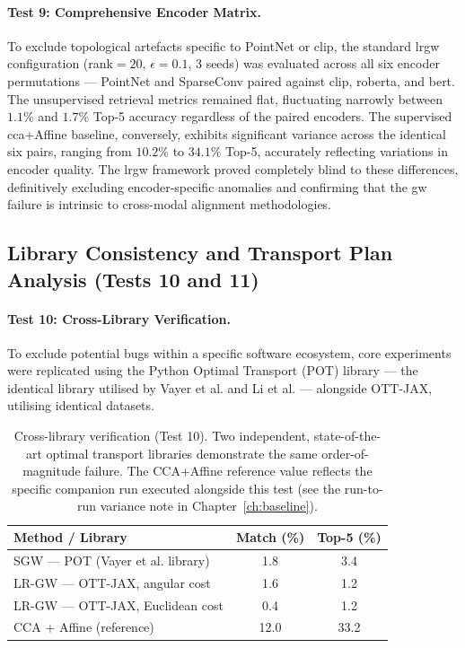 \paragraph{Test 9: Comprehensive Encoder Matrix.}
To exclude topological artefacts specific to PointNet or \gls{clip}, the standard \gls{lrgw} configuration (rank$=20$, $\epsilon=0.1$, 3 seeds) was evaluated across all six encoder permutations --- PointNet and SparseConv paired against \gls{clip}, \gls{roberta}, and \gls{bert}. The unsupervised retrieval metrics remained flat, fluctuating narrowly between $1.1\%$ and $1.7\%$ Top-5 accuracy regardless of the paired encoders. The supervised \gls{cca}+Affine baseline, conversely, exhibits significant variance across the identical six pairs, ranging from $10.2\%$ to $34.1\%$ Top-5, accurately reflecting variations in encoder quality. The \gls{lrgw} framework proved completely blind to these differences, definitively excluding encoder-specific anomalies and confirming that the \gls{gw} failure is intrinsic to cross-modal alignment methodologies.

\subsection{Library Consistency and Transport Plan Analysis (Tests 10 and 11)}
\label{subsec:library_analysis}

\paragraph{Test 10: Cross-Library Verification.}
To exclude potential bugs within a specific software ecosystem, core experiments were replicated using the Python Optimal Transport (POT) library \cite{flamary2021pot} --- the identical library utilised by Vayer et al. and Li et al. --- alongside OTT-JAX, utilising identical datasets.

\begin{table}[htpb]
\centering
\small
\begin{tabular}{lcc}
\toprule
\textbf{Method / Library} & \textbf{Match (\%)} & \textbf{Top-5 (\%)} \\
\midrule
SGW --- POT (Vayer et al. library)      & 1.8 & 3.4 \\
LR-GW --- OTT-JAX, angular cost         & 1.6 & 1.2 \\
LR-GW --- OTT-JAX, Euclidean cost       & 0.4 & 1.2 \\
CCA + Affine (reference)                & 12.0 & 33.2 \\
\bottomrule
\end{tabular}
\caption{Cross-library verification (Test 10). Two independent, state-of-the-art
optimal transport libraries demonstrate the same order-of-magnitude failure. The
CCA+Affine reference value reflects the specific companion run
executed alongside this test (see the run-to-run variance note in
Chapter~\ref{ch:baseline}).}
\label{tab:cross_library}
\end{table}

